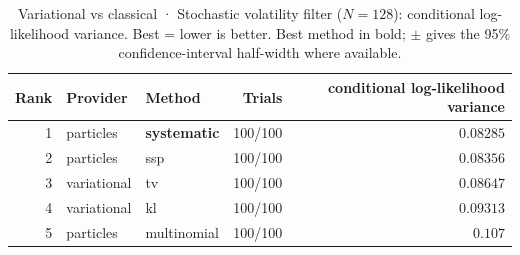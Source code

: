 \begin{table}[!htbp]
\centering
\small
\caption{Variational vs classical · Stochastic volatility filter ($N=128$): conditional log-likelihood variance. Best = lower is better. Best method in bold; $\pm$ gives the 95\% confidence-interval half-width where available.}
\label{tab:variational-vs-classical-stochastic-volatility-filter-conditional-loglik-variance}
\begin{tabular}{rllrr}
\toprule
Rank & Provider & Method & Trials & conditional log-likelihood variance \\
\midrule
1 & particles & \textbf{systematic} & 100/100 & $\mathbf{0.08285}$ \\
2 & particles & ssp & 100/100 & $0.08356$ \\
3 & variational & tv & 100/100 & $0.08647$ \\
4 & variational & kl & 100/100 & $0.09313$ \\
5 & particles & multinomial & 100/100 & $0.107$ \\
\bottomrule
\end{tabular}
\end{table}
